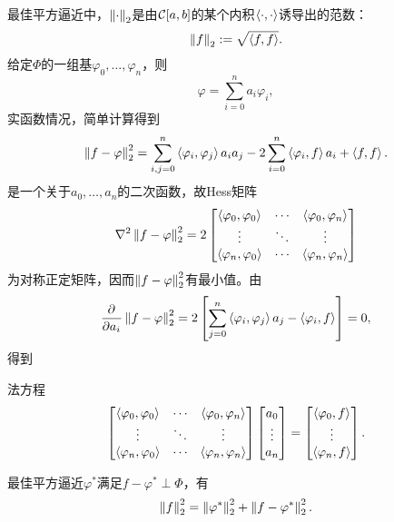 最佳平方逼近中，$\left\lVert\cdot\right\rVert_2$是由$\mathcal C[a,b]$的某个内积$\left\langle \cdot,\cdot\right\rangle$诱导出的范数：
\[
    \left\lVert f\right\rVert_2:=\sqrt{\left\langle f,f\right\rangle}.
\]
给定$\Phi$的一组基$\varphi_0,\ldots,\varphi_n$，则
\[
    \varphi=\sum_{i=0}^na_i\varphi_i,
\]
实函数情况，简单计算得到
\[
    \left\lVert f-\varphi\right\rVert_2^2=\sum_{i,j=0}^n\left\langle \varphi_i,\varphi_j\right\rangle a_ia_j-2\sum_{i=0}^n\left\langle \varphi_i,f\right\rangle a_i+\left\langle f,f\right\rangle.
\]
是一个关于$a_0,\ldots,a_n$的二次函数，故Hess矩阵
\begin{equation}
    \nabla^2\left\lVert f-\varphi\right\rVert_2^2=2\begin{bmatrix}
        \left\langle \varphi_0,\varphi_0\right\rangle&\cdots&\left\langle \varphi_0,\varphi_n\right\rangle\\
        \vdots&\ddots&\vdots\\
        \left\langle \varphi_n,\varphi_0\right\rangle&\cdots&\left\langle \varphi_n,\varphi_n\right\rangle
    \end{bmatrix}
\end{equation}
为对称正定矩阵，因而$\left\lVert f-\varphi\right\rVert_2^2$有最小值。由
\begin{equation*}
    \frac{\partial^{{}}}{\partial{a_i}^{{}}}\left\lVert f-\varphi\right\rVert_2^2=2\left[\sum_{j=0}^n\left\langle \varphi_i,\varphi_j\right\rangle a_j-\left\langle \varphi_i,f\right\rangle\right]=0,
\end{equation*}
得到
\begin{theorem}
    {法方程}{}
    \begin{equation}
        \begin{bmatrix}
            \left\langle \varphi_0,\varphi_0\right\rangle&\cdots&\left\langle \varphi_0,\varphi_n\right\rangle\\
            \vdots&\ddots&\vdots\\
            \left\langle \varphi_n,\varphi_0\right\rangle&\cdots&\left\langle \varphi_n,\varphi_n\right\rangle
        \end{bmatrix}\begin{bmatrix}
            a_0\\\vdots\\a_n
        \end{bmatrix}=\begin{bmatrix}
            \left\langle \varphi_0,f\right\rangle\\\vdots\\\left\langle \varphi_n,f\right\rangle
        \end{bmatrix}.
    \end{equation}
\end{theorem}

\begin{remark}
    最佳平方逼近$\varphi^*$满足$f-\varphi^*\perp\Phi$，有
    \begin{equation}
        \left\lVert f\right\rVert_2^2=\left\lVert\varphi^*\right\rVert_2^2+\left\lVert f-\varphi^*\right\rVert_2^2.
    \end{equation}
\end{remark}

